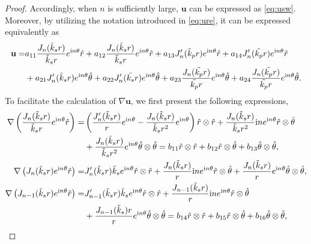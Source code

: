 \documentclass[11pt,reqno,twoside]{amsart}
\theoremstyle{definition}
\theoremstyle{remark}
\numberwithin{equation}{section}
\newcommand{\bu}{\mathbf{u}}
\begin{document}
\begin{proof}
	Accordingly, when $n$ is sufficiently large, $\bu$ can be expressed as \eqref{eq:usw}. Moreover, by utilizing the notation introduced in \eqref{eq:ure}, it can be expressed equivalently as
	\begin{align}
		\bu =&a_{11}\frac{J_{n}(\tilde{k}_{s}r) }{\tilde{k}_{s}r} e^{\mathrm{i}n\theta }\hat{r} +a_{12}\frac{J_{n}(\tilde{k}_{s}r) }{\tilde{k}_{s}r} e^{\mathrm{i}n\theta }\hat{r}+a_{13}J_{n}'(\tilde{k}_{p}r)e^{\mathrm{i}n\theta }\hat{r}   +a_{14}J_{n}'(\tilde{k_{p}}r)e^{\mathrm{i}n\theta }\hat{r} \notag \\
		&+a_{21}J_{n}'(\tilde{k}_{s}r)e^{\mathrm{i}n\theta }\hat{\theta}+a_{22}J_{n}'(\tilde{k_{s}}r)e^{\mathrm{i}n\theta }\hat{\theta}+a_{23}\frac{J_{n}(\tilde{k_{p}}r) }{\tilde{k_{p}}r} e^{\mathrm{i}n\theta }\hat{\theta}+a_{24}\frac{J_{n}(\tilde{k_{p}}r) }{\tilde{k_{p}}r} e^{\mathrm{i}n\theta }\hat{\theta}.\label{eq:uret}
	\end{align}
	\iffalse
	To facilitate the calculation of $\nabla\bu$, we first present the following expressions,
	\begin{align}
		\nabla \left ( \frac{J_{n} (\tilde{k}_{s } r )}{\tilde{k}_{s}r} e^{\mathrm{i}n\theta }\hat{r}  \right )=&\left( \frac{J_{n}' (\tilde{k}_{s } r )}{r} e^{\mathrm{i}n\theta } -\frac{J_{n} (\tilde{k}_{s } r )}{\tilde{k}_{s}r^2} e^{\mathrm{i}n\theta }\right)\hat{r}\otimes\hat{r}+\frac{J_{n} (\tilde{k}_{s } r )}{\tilde{k}_{s}r^2}\mathrm{i}n e^{\mathrm{i}n\theta }\hat{r}\otimes\hat{\theta }\notag\\
		&+\frac{J_{n} (\tilde{k}_{s } r )}{\tilde{k}_{s}r^2}e^{\mathrm{i}n\theta }\hat{\theta }\otimes\hat{\theta }= b_{11}\hat{r}\otimes\hat{r}+b_{12}\hat{r}\otimes\hat{\theta }+b_{13}\hat{\theta }\otimes\hat{\theta },\notag\\
		\nabla \left ( J_{n} (\tilde{k}_{s } r ) e^{\mathrm{i}n\theta } \hat{r}  \right )= &J_{n}' (\tilde{k}_{s} r) \tilde{k}_{s} e^{\mathrm{i}n\theta } \hat{r}\otimes\hat{r}+\frac{J_{n} ( \tilde{k}_{s} r )}{r}\mathrm{i}n e^{\mathrm{i}n\theta }\hat{r}\otimes\hat{\theta }+\frac{J_{n} ( \tilde{k}_{s } r )}{r}e^{\mathrm{i}n\theta }\hat{\theta }\otimes\hat{\theta },\notag\\	
		\nabla \left ( J_{n-1} (\tilde{k}_{s}  r ) e^{\mathrm{i}n\theta } \hat{r}  \right )=& J_{n-1}' (\tilde{k}_{s} r) \tilde{k}_{s} e^{\mathrm{i}n\theta } \hat{r}\otimes\hat{r}+\frac{J_{n-1} ( \tilde{k}_{s}  r )}{r}\mathrm{i}n e^{\mathrm{i}n\theta }\hat{r}\otimes\hat{\theta }\notag\\
		&+\frac{J_{n-1} ( \tilde{k}_{s} ) r} {r}e^{\mathrm{i}n\theta }\hat{\theta }\otimes\hat{\theta }=b_{14}\hat{r}\otimes\hat{r}+b_{15}\hat{r}\otimes\hat{\theta }+b_{16}\hat{\theta }\otimes\hat{\theta },\notag\\

\end{align}
\end{proof}
\end{document}
